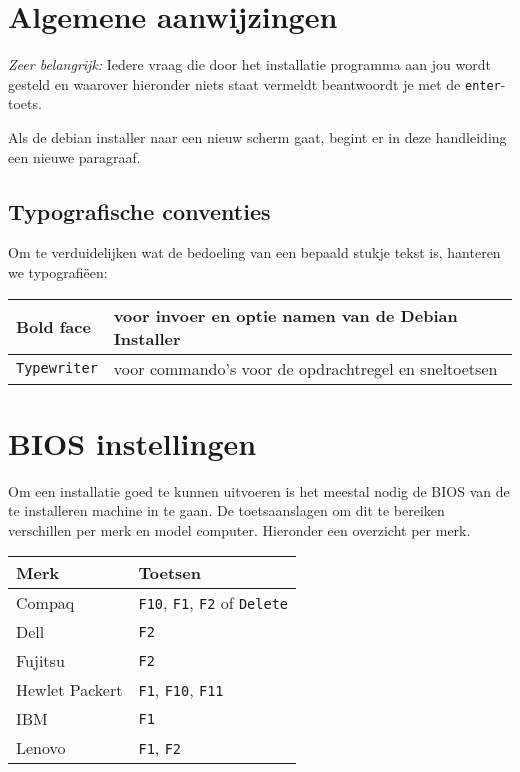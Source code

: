 \section{Algemene aanwijzingen}
\emph{Zeer belangrijk:} Iedere vraag die door het installatie programma aan jou wordt gesteld en waarover hieronder niets staat vermeldt beantwoordt je met de \texttt{enter}-toets.

Als de debian installer naar een nieuw scherm gaat, begint er in deze handleiding een nieuwe paragraaf.
\subsection{Typografische conventies}
Om te verduidelijken wat de bedoeling van een bepaald stukje tekst is, hanteren we typografi\"{e}en:
\begin{table}[H]
\begin{tabular}{| l | l |}
	\hline
	\textbf{Bold face} & voor invoer en optie namen van de Debian Installer\\
	\hline
	\texttt{Typewriter} & voor commando's voor de opdrachtregel en sneltoetsen\\
	\hline
\end{tabular}
\end{table}

\section{BIOS instellingen}
Om een installatie goed te kunnen uitvoeren is het meestal nodig de BIOS van de te installeren machine in te gaan. De toetsaanslagen om dit te bereiken verschillen per merk en model computer. Hieronder een overzicht per merk.
\begin{table}[H]
	\begin{tabular}{| l | l |}
	\hline 
	\textbf{Merk} & \textbf{Toetsen} \\
	\hline
	Compaq & \texttt{F10}, \texttt{F1}, \texttt{F2} of \texttt{Delete}\\
	\hline
	Dell & \texttt{F2} \\
	\hline
	Fujitsu & \texttt{F2} \\
	\hline
	Hewlet Packert &  \texttt{F1}, \texttt{F10}, \texttt{F11} \\
	\hline
	IBM &  \texttt{F1} \\
	\hline
	Lenovo &  \texttt{F1}, \texttt{F2} \\
	\hline
\end{tabular}
\end{table}
